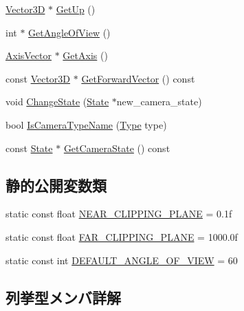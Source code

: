 \begin{DoxyCompactItemize}
\mbox{\hyperlink{class_vector3_d}{Vector3D}} $\ast$ \mbox{\hyperlink{class_camera_aa767cb71ea435cee1e42effc912904eb}{Get\+Up}} ()
\item 
int $\ast$ \mbox{\hyperlink{class_camera_ade0384f73a582e21259a12cbcae0d642}{Get\+Angle\+Of\+View}} ()
\item 
\mbox{\hyperlink{class_axis_vector}{Axis\+Vector}} $\ast$ \mbox{\hyperlink{class_camera_a62c4371143e87e34c70d27f2728987d9}{Get\+Axis}} ()
\item 
const \mbox{\hyperlink{class_vector3_d}{Vector3D}} $\ast$ \mbox{\hyperlink{class_camera_aec9441c5c1924df0a0cacbcf28c839e2}{Get\+Forward\+Vector}} () const
\item 
void \mbox{\hyperlink{class_camera_abb88028a49a71e9a6774d58076816dbf}{Change\+State}} (\mbox{\hyperlink{class_camera_1_1_state}{State}} $\ast$new\+\_\+camera\+\_\+state)
\item 
bool \mbox{\hyperlink{class_camera_af1bd90387ddb83c2af82e92e3fc472af}{Is\+Camera\+Type\+Name}} (\mbox{\hyperlink{class_camera_a3b0a1f58deca679ac665f61c480d1dcb}{Type}} type)
\item 
const \mbox{\hyperlink{class_camera_1_1_state}{State}} $\ast$ \mbox{\hyperlink{class_camera_a47e72bd04f7aaac1657d7bce5322b97c}{Get\+Camera\+State}} () const
\end{DoxyCompactItemize}
\subsection*{静的公開変数類}
\begin{DoxyCompactItemize}
\item 
static const float \mbox{\hyperlink{class_camera_ad2e91249b7878a87cd23cf7dd5d86e00}{N\+E\+A\+R\+\_\+\+C\+L\+I\+P\+P\+I\+N\+G\+\_\+\+P\+L\+A\+NE}} = 0.\+1f
\item 
static const float \mbox{\hyperlink{class_camera_a90ee4c7f7bbcb5d2b0ab86d14ed60d90}{F\+A\+R\+\_\+\+C\+L\+I\+P\+P\+I\+N\+G\+\_\+\+P\+L\+A\+NE}} = 1000.\+0f
\item 
static const int \mbox{\hyperlink{class_camera_a0e0f326c66006cf7f9dc29b3e2b86b81}{D\+E\+F\+A\+U\+L\+T\+\_\+\+A\+N\+G\+L\+E\+\_\+\+O\+F\+\_\+\+V\+I\+EW}} = 60
\end{DoxyCompactItemize}


\subsection{列挙型メンバ詳解}
\mbox{\label{class_camera_a3b0a1f58deca679ac665f61c480d1dcb}} 
